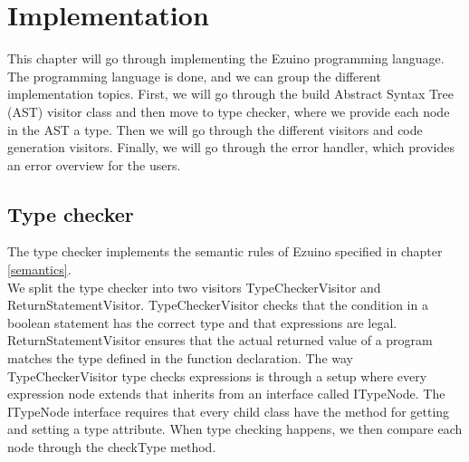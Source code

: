 \chapter{Implementation}
This chapter will go through implementing the Ezuino programming language. The programming language is done, and we can group the different implementation topics. First, we will go through the build Abstract Syntax Tree (AST) visitor class and then move to type checker, where we provide each node in the AST a type. Then we will go through the different visitors and code generation visitors. Finally, we will go through the error handler, which provides an error overview for the users.
\section{Type checker}
The type checker implements the semantic rules of Ezuino specified in chapter \ref{semantics}. \\
We split the type checker into two visitors TypeCheckerVisitor and ReturnStatementVisitor. TypeCheckerVisitor checks that the condition in a boolean statement has the correct type and that expressions are legal. ReturnStatementVisitor ensures that the actual returned value of a program matches the type defined in the function declaration.
The way TypeCheckerVisitor type checks expressions is through a setup where every expression node extends that inherits from an interface called ITypeNode. The ITypeNode interface requires that every child class have the method for getting and setting a type attribute. When type checking happens, we then compare each node through the checkType method.
\begin{figure}[H]
\centering
{}
\caption{}
\label{dadsa}
\end{figure}

